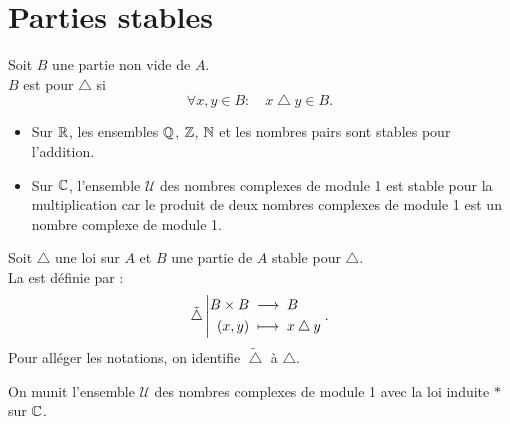 \documentclass{book}
\begin{document}
\section{Parties stables}
\begin{Definition}
Soit $B$ une partie non vide de $A$.\\
$B$ est  pour $\bigtriangleup$ si  
$$\forall x, y \in B :\quad   x \bigtriangleup y \in B.$$
\end{Definition}
\begin{Exemple}
\begin{itemize}
\item Sur $\mathbb{R}$, les ensembles $\mathbb{Q}$, $\mathbb{Z}$, $\mathbb{N}$ et les nombres pairs sont stables pour l'addition. 
\item Sur $\mathbb{C}$, l'ensemble $ \mathcal{U}$ des nombres complexes de module 1 est stable pour la multiplication car le produit de deux nombres
complexes de module 1 est un nombre complexe de module 1.
\end{itemize}
\end{Exemple}
\begin{Definition}
Soit $\bigtriangleup$ une loi sur $A$ et $B$ une partie de $A$ stable pour $\bigtriangleup$.\\
La  est définie par  :
$$ {\tilde{\bigtriangleup}}\left|\begin{aligned}{B\times B}&\;\longrightarrow\;{B}\\{(x,y)}&\;\longmapsto\;{x \bigtriangleup y}\end{aligned}\right..$$
Pour alléger les notations, on identifie $\tilde{\bigtriangleup}$ à $\bigtriangleup$. 
\end{Definition}
\begin{Exemple}On munit  l'ensemble $ \mathcal{U}$ des nombres complexes de module 1 avec la loi induite $*$ sur $\mathbb{C}$.
\end{Exemple}
\end{document}
